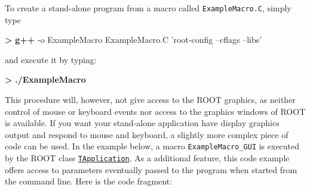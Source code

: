 \documentclass{article}
\newenvironment{Shaded}{}{}
\newcommand{\KeywordTok}[1]{\textcolor[rgb]{0.00,0.44,0.13}{\textbf{{#1}}}}
\newcommand{\StringTok}[1]{\textcolor[rgb]{0.25,0.44,0.63}{{#1}}}
\newcommand{\NormalTok}[1]{{#1}}
\begin{document}
To create a stand-alone program from a macro called
\texttt{ExampleMacro.C}, simply type

\begin{Shaded}
\begin{Highlighting}[]
 \KeywordTok{>} \KeywordTok{g++} \NormalTok{-o ExampleMacro ExampleMacro.C }\StringTok{'root-config --cflags --libs'}
\end{Highlighting}
\end{Shaded}

and execute it by typing:

\begin{Shaded}
\begin{Highlighting}[]
 \KeywordTok{>} \KeywordTok{./ExampleMacro}
\end{Highlighting}
\end{Shaded}

This procedure will, however, not give access to the ROOT graphics, as
neither control of mouse or keyboard events nor access to the graphics
windows of ROOT is available. If you want your stand-alone application
have display graphics output and respond to mouse and keyboard, a
slightly more complex piece of code can be used. In the example below, a
macro \texttt{ExampleMacro\_GUI} is executed by the ROOT class
\href{https://root.cern.ch/doc/master/classTApplication.html}{\texttt{TApplication}}.
As a additional feature, this code example offers access to parameters
eventually passed to the program when started from the command line.
Here is the code fragment:
\end{document}
